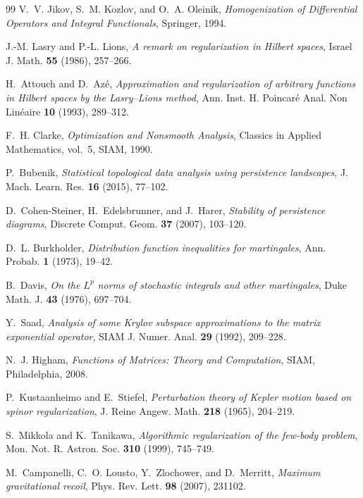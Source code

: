 \documentclass[11pt,a4paper,reqno]{article}
\theoremstyle{plain}
\theoremstyle{definition}
\theoremstyle{remark}
\numberwithin{equation}{section}
\begin{document}
\begin{thebibliography}{99}
V.~V. Jikov, S.~M. Kozlov, and O.~A. Oleinik,
\emph{Homogenization of Differential Operators and Integral Functionals},
Springer, 1994.

J.-M. Lasry and P.-L. Lions,
\emph{A remark on regularization in Hilbert spaces},
Israel J. Math. \textbf{55} (1986), 257--266.

H.~Attouch and D.~Az\'e,
\emph{Approximation and regularization of arbitrary functions in Hilbert spaces by the Lasry--Lions method},
Ann. Inst. H. Poincar\'e Anal. Non Lin\'eaire \textbf{10} (1993), 289--312.

F.~H. Clarke,
\emph{Optimization and Nonsmooth Analysis},
Classics in Applied Mathematics, vol.~5, SIAM, 1990.

P.~Bubenik,
\emph{Statistical topological data analysis using persistence landscapes},
J. Mach. Learn. Res. \textbf{16} (2015), 77--102.

D.~Cohen-Steiner, H.~Edelsbrunner, and J.~Harer,
\emph{Stability of persistence diagrams},
Discrete Comput. Geom. \textbf{37} (2007), 103--120.

D.~L. Burkholder,
\emph{Distribution function inequalities for martingales},
Ann. Probab. \textbf{1} (1973), 19--42.

B.~Davis,
\emph{On the $L^p$ norms of stochastic integrals and other martingales},
Duke Math. J. \textbf{43} (1976), 697--704.

Y.~Saad,
\emph{Analysis of some Krylov subspace approximations to the matrix exponential operator},
SIAM J. Numer. Anal. \textbf{29} (1992), 209--228.

N.~J. Higham,
\emph{Functions of Matrices: Theory and Computation},
SIAM, Philadelphia, 2008.


P.~Kustaanheimo and E.~Stiefel,
\emph{Perturbation theory of Kepler motion based on spinor regularization},
J. Reine Angew. Math. \textbf{218} (1965), 204--219.

S.~Mikkola and K.~Tanikawa,
\emph{Algorithmic regularization of the few-body problem},
Mon. Not. R. Astron. Soc. \textbf{310} (1999), 745--749.

M.~Campanelli, C.~O. Lousto, Y.~Zlochower, and D.~Merritt,
\emph{Maximum gravitational recoil},
Phys. Rev. Lett. \textbf{98} (2007), 231102.


\end{thebibliography}
\end{document}
